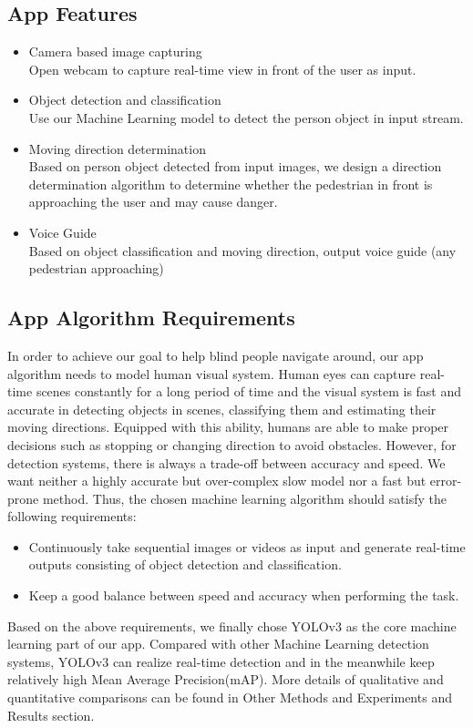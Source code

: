 \documentclass[letterpaper]{article} %
\begin{document}
\subsection{App Features}
\begin{itemize}
\item Camera based image capturing \\
Open webcam to capture real-time view in front of the user as input.
\item Object detection and classification \\
Use our Machine Learning model to detect the person object in input stream.
\item Moving direction determination \\
Based on person object detected from input images, we design a direction determination algorithm to determine whether the pedestrian in front is approaching the user and may cause danger.
\item Voice Guide \\
Based on object classification and moving direction, output voice guide (any pedestrian approaching)
\end{itemize}
\subsection{App Algorithm Requirements}
In order to achieve our goal to help blind people navigate around, our app algorithm needs to model human visual system. Human eyes can capture real-time scenes constantly for a long period of time and the visual system is fast and accurate in detecting objects in scenes, classifying them and estimating their moving directions. Equipped with this ability, humans are able to make proper decisions such as stopping or changing direction to avoid obstacles. However, for detection systems, there is always a trade-off between accuracy and speed. We want neither a highly accurate but over-complex slow model nor a fast but error-prone method. Thus, the chosen machine learning algorithm should satisfy the following requirements:
\begin{itemize}
    \item Continuously take sequential images or videos as input and generate real-time outputs consisting of object detection and classification.
    \item Keep a good balance between speed and accuracy when performing the task.
\end{itemize}
Based on the above requirements, we finally chose YOLOv3\cite{YOLO} as the core machine learning part of our app. Compared with other Machine Learning detection systems, YOLOv3 can realize real-time detection and in the meanwhile keep relatively high Mean Average Precision(mAP)\cite{YOLO}. More details of qualitative and quantitative comparisons can be found in Other Methods and Experiments and Results section.
\end{document}
